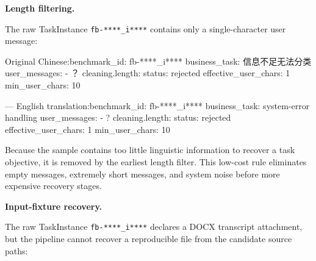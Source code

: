\documentclass{llmxive}
\providecommand{\inlinett}[1]{{\footnotesize\texttt{#1}}}
\providecommand{\caseheader}[1]{\noindent\colorbox{fbcaseblue}{\parbox{0.96\linewidth}{\bfseries #1}}\vspace{0.5mm}\newline}
\begin{document}
\caseheader{Length filtering.}
The raw TaskInstance \inlinett{fb-****\_i****} contains only a single-character user message:

\begin{casebox}\scriptsize
\begin{caselines}
Original Chinese:\nopagebreak[4]
benchmark\_id: fb-****\_i****
business\_task: 信息不足无法分类
user\_messages:
- ？
cleaning.length:
  status: rejected
  effective\_user\_chars: 1
  min\_user\_chars: 10

---
English translation:\nopagebreak[4]
benchmark\_id: fb-****\_i****
business\_task: system-error handling
user\_messages:
- ?
cleaning.length:
  status: rejected
  effective\_user\_chars: 1
  min\_user\_chars: 10
\end{caselines}
\end{casebox}

Because the sample contains too little linguistic information to recover a task objective, it is removed by the earliest length filter. This low-cost rule eliminates empty messages, extremely short messages, and system noise before more expensive recovery stages.

\caseheader{Input-fixture recovery.}
The raw TaskInstance \inlinett{fb-****\_i****} declares a DOCX transcript attachment, but the pipeline cannot recover a reproducible file from the candidate source paths:
\end{document}
